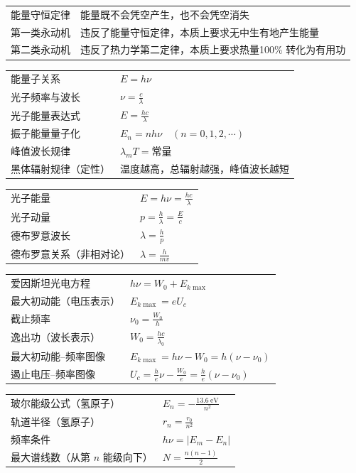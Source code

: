 \begin{tabularx}{\columnwidth}{XX}
  能量守恒定律 & 能量既不会凭空产生，也不会凭空消失 \\
  第一类永动机 & 违反了能量守恒定律，本质上要求无中生有地产生能量 \\
  第二类永动机 & 违反了热力学第二定律，本质上要求热量100\% 转化为有用功 \\
\end{tabularx}
\medskip

\begin{tabularx}{\columnwidth}{XX}
  能量子关系 & $E=h\nu$ \\
  光子频率与波长 & $\nu=\frac{c}{\lambda}$ \\
  光子能量表达式 & $E=\frac{hc}{\lambda}$ \\
  振子能量量子化 & $E_n=nh\nu\quad(n=0,1,2,\cdots)$ \\
  峰值波长规律 & $\lambda_m T=\text{常量}$ \\
  黑体辐射规律（定性） & 温度越高，总辐射越强，峰值波长越短 \\
\end{tabularx}
\medskip

\begin{tabularx}{\columnwidth}{XX}
  光子能量 & $E=h\nu=\frac{hc}{\lambda}$ \\
  光子动量 & $p=\frac{h}{\lambda}=\frac{E}{c}$ \\
  德布罗意波长 & $\lambda=\frac{h}{p}$ \\
  德布罗意关系（非相对论） & $\lambda=\frac{h}{mv}$ \\
\end{tabularx}
\medskip

\begin{tabularx}{\columnwidth}{XX}
  爱因斯坦光电方程 & $h\nu=W_0+E_{k\max}$ \\
  最大初动能（电压表示） & $E_{k\max}=eU_c$ \\
  截止频率 & \(\nu_0=\frac{W_0}{h}\) \\
  逸出功（波长表示） & \(W_0=\frac{hc}{\lambda_0}\) \\
  最大初动能--频率图像 & \(E_{k\max}=h\nu-W_0=h(\nu-\nu_0)\) \\
  遏止电压--频率图像 & \(U_c=\frac{h}{e}\nu-\frac{W_0}{e}=\frac{h}{e}(\nu-\nu_0)\) \\
\end{tabularx}
\medskip

\begin{tabularx}{\columnwidth}{XX}
  玻尔能级公式（氢原子） & $E_n=-\frac{13.6\ \mathrm{eV}}{n^2}$ \\
  轨道半径（氢原子） & $r_n=\frac{r_0}{n^2}$ \\
  频率条件 & $h\nu=|E_m-E_n|$ \\
  最大谱线数（从第 $n$ 能级向下） & $N=\frac{n(n-1)}{2}$ \\
\end{tabularx}
\medskip

